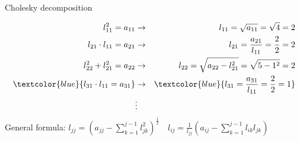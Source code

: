 \begin{frame}{Cholesky decomposition}
\begin{enumerate}
{\vspace*{-0.4cm}
\begin{eqnarray*}
l_{11}^2 = a_{11} &\rightarrow& l_{11} = \sqrt{a_{11}} = \sqrt{4} = 2 \\
l_{21} \cdot l_{11} = a_{21} &\rightarrow& l_{21} = \frac{a_{21}}{l_{11}}  = \frac{2}{2} = 2 \\
l_{22}^2 + l_{21}^2 = a_{22} &\rightarrow& l_{22} = \sqrt{a_{22} - l_{21}^2} = \sqrt{5 - 1^2} = 2 \\
\textcolor{blue}{l_{31} \cdot l_{11} = a_{31}}  &\rightarrow& \textcolor{blue}{l_{31} = \frac{a_{31}}{l_{11}} = \frac{2}{2} = 1 } \\
&\vdots &
\end{eqnarray*}
General formula: $ l_{jj} = \left(a_{jj} - \sum_{k = 1}^{j - 1}l_{jk}^2\right)^{\frac{1}{2}} \quad
l_{ij} = \frac{1}{l_{jj}}\left(a_{ij} - \sum_{k = 1}^{j - 1}l_{ik}l_{jk}\right)$
}

\normalsize
\end{enumerate}

\end{frame}

